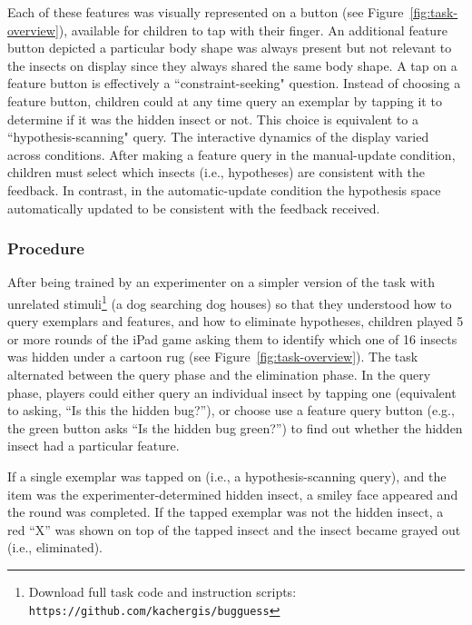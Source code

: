 \documentclass[man,floatsintext]{apa6}
\begin{document}
Each of these features was visually represented on a button (see Figure~\ref{fig:task-overview}), available for children to tap with their finger.   An additional feature button depicted a particular body shape was always present but not relevant to the insects on display since they always
shared the same body shape.  A tap on a feature button is effectively a ``constraint-seeking" question. 
Instead of choosing a feature button, children could at any time query an exemplar by tapping it to determine if it was the hidden insect or not. This choice is equivalent to a ``hypothesis-scanning" query.  
The interactive dynamics of the display varied across conditions.  After making a feature query in the manual-update condition, children must select which insects (i.e., hypotheses) are consistent with the feedback.  In contrast, in the automatic-update condition the hypothesis space automatically updated to be consistent with the feedback received.

\subsubsection{Procedure}

After being trained by an experimenter on a simpler version of the task with unrelated stimuli\footnote{Download 
full task code and instruction scripts: \texttt{https://github.com/kachergis/bugguess}} (a dog searching dog houses) so that they understood how to query exemplars and features, and how 
to eliminate hypotheses, children played 5 or more rounds of the iPad game asking them 
to identify which one of 16 insects was hidden under a cartoon rug (see Figure~\ref{fig:task-overview}). 
The task alternated between the query phase and the elimination phase. In the query phase, 
players could either query an individual insect by tapping one (equivalent 
to asking, ``Is this the hidden bug?''), or choose use a feature query button (e.g., the green button asks 
``Is the hidden bug green?'') to find out whether the hidden insect had a particular feature. 

If a single exemplar was tapped on (i.e., a hypothesis-scanning query), and the item was the experimenter-determined
hidden insect, a smiley face appeared and the round was completed.  If the tapped exemplar 
was not the hidden insect, a red ``X'' was shown on top of the tapped insect and the insect became
grayed out (i.e., eliminated). 
\end{document}
